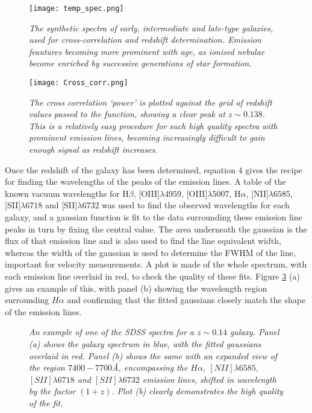 \documentclass{literature}
\begin{document}
\begin{figure}[!htp]
\centering
\texttt{[image: temp\_spec.png]}
\caption{\footnotesize{\emph{The synthetic spectra of early, intermediate and late-type galaxies, used for cross-correlation and redshift determination. Emission feautures becoming more prominent with age, as ionised nebulae become enriched by successive generations of star formation.}}}
\label{fig:temp_spec}
\end{figure} 

\begin{figure}[!htp]
\centering
\texttt{[image: Cross\_corr.png]}
\caption{\footnotesize{\emph{The cross correlation `power' is plotted against the grid of redshift values passed to the function, showing a clear peak at $z\sim 0.138$. This is a relatively easy procedure for such high quality spectra with prominent emission lines, becoming increasingly difficult to gain enough signal as redshift increases. }}}
\label{fig:cross_cor}
\end{figure} 

Once the redshift of the galaxy has been determined, equation 4 gives the recipe for finding the wavelengths of the peaks of the emission lines. A table of the known vacuum wavelengths for H$\beta$, [OIII]$\lambda 4959$, [OIII]$\lambda 5007$, H$\alpha$, [NII]$\lambda 6585$, [SII]$\lambda 6718$ and [SII]$\lambda 6732$ was used to find the observed wavelengths for each galaxy, and a gaussian function is fit to the data surrounding these emission line peaks in turn by fixing the central value. The area underneath the gaussian is the flux of that emission line and is also used to find the line equivalent width, whereas the width of the gaussian is used to determine the FWHM of the line, important for velocity measurements. A plot is made of the whole spectrum, with each emission line overlaid in red, to check the quality of these fits. Figure \ref{fig:fitted_spec} (a) gives an example of this, with panel (b) showing the wavelength region surrounding $H\alpha$ and confirming that the fitted gaussians closely match the shape of the emission lines.\\    

\begin{figure}[!htp]
\centering
{}
\caption{\footnotesize{\emph{An example of one of the SDSS spectra for a $z\sim 0.14$ galaxy. Panel (a) shows the galaxy spectrum in blue, with the fitted gaussians overlaid in red. Panel (b) shows the same with an expanded view of the region $7400-7700$\AA, encompassing the $H\alpha$, $[NII]\lambda 6585$, $[SII]\lambda 6718$ and $[SII]\lambda 6732$ emission lines, shifted in wavelength by the factor $(1 + z)$. Plot (b) clearly demonstrates the high quality of the fit.}}}
\label{fig:fitted_spec}
\end{figure}
\end{document}
